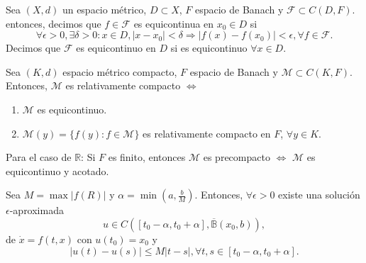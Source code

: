 \begin{defn}[Equicontinuidad]
  Sea $(X , d)$ un espacio métrico, $D \subset X$, $F$ espacio de Banach y $\mathcal{F} \subset C(D, F)$. entonces, decimos que $f \in \mathcal{F}$ es equicontinua en $x_{0} \in D$ si
  \[ 
    \forall \epsilon > 0, \exists \delta > 0 : x \in D, | x -x_{0} |< \delta \Rightarrow | f(x) -f(x_{0}) | < \epsilon, \forall f \in \mathcal{F}. 
  \] 
  Decimos que $\mathcal{F}$ es equicontinuo en $D$ si es equicontinuo $\forall x \in D$.
\end{defn}

\begin{theo}[Ascoli]
  Sea $(K, d)$ espacio métrico compacto, $F$ espacio de Banach y $\mathcal{M} \subset C(K, F)$. Entonces, $\mathcal{M}$ es relativamente compacto $\Leftrightarrow$
  \begin{enumerate}[label=(\roman*)]
    \item $\mathcal{M}$ es equicontinuo. 
    \item $\mathcal{M}(y) = \{ f(y) : f \in \mathcal{M} \}$ es relativamente compacto en $F$, $\forall y \in K$.
  \end{enumerate}
\end{theo}

\begin{obs}
  Para el caso de $\mathbb{R}$: Si $F$ es finito, entonces $\mathcal{M}$ es precompacto $\Leftrightarrow$ $\mathcal{M}$ es equicontinuo y acotado.
\end{obs}

\begin{lem}
  Sea $M = \max | f(R) |$ y $ \alpha = \min(a, \frac{b}{M})$. Entonces, $\forall \epsilon >0$ existe una solución $\epsilon$-aproximada
  \[ 
    u \in C([t_{0} - \alpha, t_{0} + \alpha], \overline{\mathbb{B}}(x_{0}, b)) ,
  \] 
  de $\dot{x} = f(t, x)$ con $u(t_{0}) = x_{0}$ y 
  \[ 
    | u(t) - u(s) | \leq M | t - s |, \forall t, s \in [t_{0} - \alpha, t_{0} + \alpha] .
  \] 
\end{lem}

